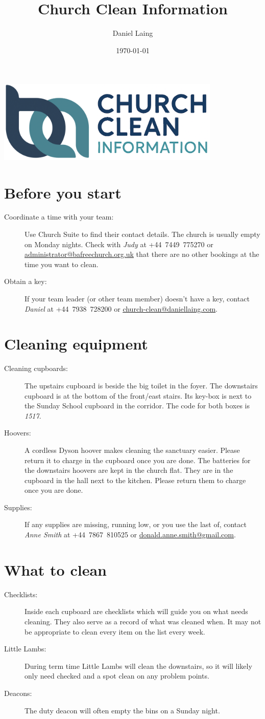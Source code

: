\documentclass[a4paper, 12pt, final, oneside]{article}
\title{Church Clean Information}
\author{Daniel Laing}
\date{\today}
\renewcommand\maketitle{%
    \hfill\includegraphics[width=0.8\textwidth]{title_img.png}\hfill%
}
\newcommand\email[1]{\href{mailto:#1}{\underline{#1}}}
\begin{document}
\maketitle{}

\section*{Before you start}
\begin{description}
    \item[Coordinate a time with your team:] Use Church Suite to find their contact details. The church is usually empty
        on Monday nights. Check with \emph{Judy} at +44~7449~775270 or \email{administrator@bafreechurch.org.uk} that
        there are no other bookings at the time you want to clean.
    \item[Obtain a key:] If your team leader (or other team member) doesn't have a key, contact \emph{Daniel} at
        +44~7938~728200 or \email{church-clean@daniellaing.com}.
\end{description}

\section*{Cleaning equipment}
\begin{description}
    \item[Cleaning cupboards:] The upstairs cupboard is beside the big toilet in the foyer. The downstairs cupboard is
        at the bottom of the front/east stairs. Its key-box is next to the Sunday School cupboard in the corridor. The
        code for both boxes is \emph{1517}.
    \item[Hoovers:] A cordless Dyson hoover makes cleaning the sanctuary easier. Please return it to charge in the
        cupboard once you are done. The batteries for the downstairs hoovers are kept in the church flat. They are in
        the cupboard in the hall next to the kitchen. Please return them to charge once you are done.
    \item[Supplies:] If any supplies are missing, running low, or you use the last of, contact \emph{Anne Smith} at
        +44~7867~810525 or \email{donald.anne.smith@gmail.com}.
\end{description}

\section*{What to clean}
\begin{description}
    \item[Checklists:] Inside each cupboard are checklists which will guide you on what needs cleaning. They also serve
        as a record of what was cleaned when. It may not be appropriate to clean every item on the list every week.
    \item[Little Lambs:] During term time Little Lambs will clean the downstairs, so it will likely only need checked
        and a spot clean on any problem points.
    \item[Deacons:] The duty deacon will often empty the bins on a Sunday night.
\end{description}
\end{document}
